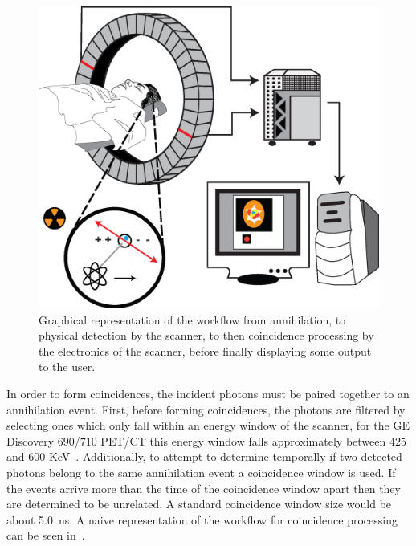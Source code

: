                 \begin{figure}
                    \centering
                    
                    \includegraphics[width=1.0\linewidth]{figures/background_coincidence_processing.png}
                    
                    \captionsetup{singlelinecheck=false, justification=raggedright}
                    \caption{Graphical representation of the workflow from annihilation, to physical detection by the scanner, to then coincidence processing by the electronics of the scanner, before finally displaying some output to the user.} \label{fig:coincidence_processing_coincidence_processing}
                \end{figure}

                In order to form coincidences, the incident photons must be paired together to an annihilation event. First, before forming coincidences, the photons are filtered by selecting ones which only fall within an energy window of the scanner, for the \gls{GE} Discovery $690$/$710$ \gls{PET}/\gls{CT} this energy window falls approximately between $425$ and $600$ \gls{KeV}~\parencite{Bettinardi2011}. Additionally, to attempt to determine temporally if two detected photons belong to the same annihilation event a coincidence window is used. If the events arrive more than the time of the coincidence window apart then they are determined to be unrelated. A standard coincidence window size would be about \SI{5.0}{\nano\second}. A naive representation of the workflow for coincidence processing can be seen in~.
            
